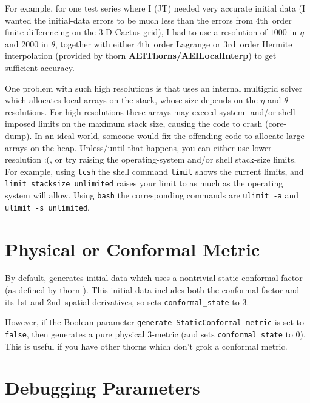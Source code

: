 \documentclass{article}
\begin{document}
For example, for one test series where I (JT) needed very accurate
initial data (I wanted the initial-data errors to be much less than
the errors from 4th~order finite differencing on the 3-D Cactus grid),
I had to use a resolution of $1000$ in $\eta$ and $2000$ in $\theta$,
together with either 4th~order Lagrange or 3rd~order Hermite interpolation
(provided by thorn \textbf{AEIThorns/AEILocalInterp}) to get sufficient
accuracy.

One problem with such high resolutions is that 
uses an internal multigrid solver which allocates local arrays on the
stack, whose size depends on the $\eta$ and $\theta$ resolutions.
For high resolutions these arrays may exceed system- and/or shell-imposed
limits on the maximum stack size, causing the code to crash (core-dump).
In an ideal world, someone would fix the offending code to allocate
large arrays on the heap.  Unless/until that happens, you can either
use lower resolution :(, or try raising the operating-system and/or
shell stack-size limits.
For example, using \verb|tcsh| the shell command \verb|limit|
shows the current limits, and \verb|limit stacksize unlimited|
raises your limit to as much as the operating system will allow.
Using \verb|bash| the corresponding commands are \verb|ulimit -a|
and \verb|ulimit -s unlimited|.


\section{Physical or Conformal Metric}

By default,  generates initial data which uses
a nontrivial static conformal factor (as defined by thorn
).  This initial data includes both the
conformal factor and its 1st and 2nd~spatial derivatives,
so  sets \verb|conformal_state| to 3.

However, if the Boolean parameter \verb|generate_StaticConformal_metric|
is set to \verb|false|, then  generates a pure
physical 3-metric (and sets \verb|conformal_state| to 0).  This is
useful if you have other thorns which don't grok a conformal metric.


\section{Debugging Parameters}
\end{document}
